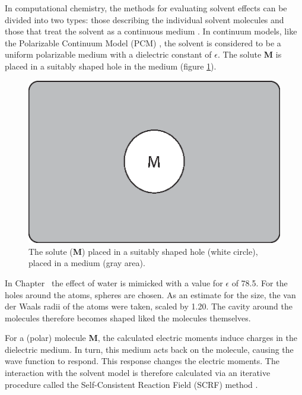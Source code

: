 In computational chemistry, the methods for evaluating solvent effects can be divided into two types: those describing the individual solvent molecules and those that treat the solvent as a continuous medium \cite{jensen}. In continuum models, like the Polarizable Continuum Model (PCM) \cite{pcm1,pcm2}, the solvent is considered to be a uniform polarizable medium with a dielectric constant of $\epsilon$. The solute \textbf{M} is placed in a suitably shaped hole in the medium (figure \ref{ch1.fig.continuum}).
\begin{figure}
\center
\includegraphics[scale=0.6]{introduction/figures/continuum.eps}
\caption{The solute (\textbf{M}) placed in a suitably shaped hole (white circle), placed in a medium (gray area).}
\label{ch1.fig.continuum}
\end{figure}
In Chapter \chdissociation\ the effect of water is mimicked with a value for $\epsilon$ of 78.5. For the holes around the atoms, spheres are chosen. As an estimate for the size, the van der Waals radii of the atoms were taken, scaled by 1.20. The cavity around the molecules therefore becomes shaped liked the molecules themselves. 

For a (polar) molecule \textbf{M}, the calculated electric moments induce charges in the dielectric medium. In turn, this medium acts back on the molecule, causing the wave function to respond. This response changes the electric moments. The interaction with the solvent model is therefore calculated via an iterative procedure called the Self-Consistent Reaction Field (SCRF) method \cite{jensen}.


